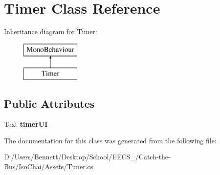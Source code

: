 \hypertarget{class_timer}{}\section{Timer Class Reference}
\label{class_timer}
Inheritance diagram for Timer\+:\begin{figure}[H]
\begin{center}
\leavevmode
\includegraphics[height=2.000000cm]{class_timer}
\end{center}
\end{figure}
\subsection*{Public Attributes}
\begin{DoxyCompactItemize}
\item 
\mbox{\label{class_timer_a7338e87668aaff752032a6b9aeba1b32}} 
Text {\bfseries timer\+UI}
\end{DoxyCompactItemize}


The documentation for this class was generated from the following file\+:\begin{DoxyCompactItemize}
\item 
D\+:/\+Users/\+Bennett/\+Desktop/\+School/\+E\+E\+C\+S\+\_/\+Catch-\/the-\/\+Bus/\+Iso\+Chai/\+Assets/Timer.\+cs\end{DoxyCompactItemize}

